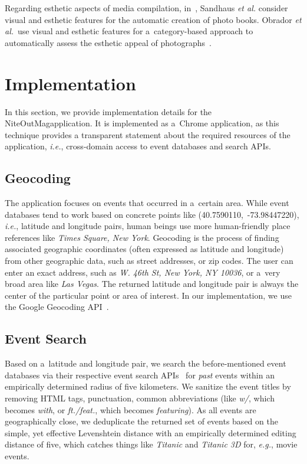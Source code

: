 \documentclass{acm_proc_article-sp}
\let\oldemph\emph
\renewcommand{\emph}[1]{\oldemph{\fontsize{9}{9}\selectfont #1}}
\begin{document}
Regarding esthetic aspects of media compilation,
in~\cite{Sandhaus2011}, Sandhaus \emph{et al.} consider visual and
esthetic features for the automatic creation of photo books.
Obrador \emph{et al.}\ use visual and esthetic features
for a~category-based approach to automatically assess
the esthetic appeal of photographs~\cite{Obrador2012}.

\section{Implementation}
In this section, we provide implementation details for the
NiteOutMag\texttrademark application.
It is implemented as a~Chrome application, as this technique provides
a transparent statement about the required resources of the application,
\emph{i.e.}, cross-domain access to event databases and search APIs.

\subsection{Geocoding}
The application focuses on events that occurred in a~certain area.
While event databases tend to work based on concrete points like
\mbox{(40.7590110, -73.98447220)}, \emph{i.e.},
latitude and longitude pairs, human beings use more human-friendly place references
like \emph{Times Square, New York}.
Geocoding is the process of finding associated geographic coordinates
(often expressed as latitude and longitude) from other geographic data,
such as street addresses, or zip codes.
The user can enter an exact address, such as
\emph{618 W. 46th St, New York, NY 10036}, or a~very broad area like \emph{Las Vegas}.
The returned latitude and longitude pair is always the center
of the particular point or area of interest.
In our implementation, we use the Google Geocoding API~\cite{Geocoding2012}.

\subsection{Event Search}
Based on a~latitude and longitude pair, we search the before-mentioned
event databases via their respective event search
APIs~\cite{Eventful2012,Foursquare2012,GooglePlaces2012,Upcoming2012}
for \emph{past} events within an empirically determined radius of five kilometers.
We sanitize the event titles by removing HTML tags, punctuation,
common abbreviations (like \emph{w/}, which becomes \emph{with}, or \emph{ft./feat.},
which becomes \emph{featuring}).
As all events are geographically close, we deduplicate the returned set of events
based on the simple, yet effective Levenshtein distance
with an empirically determined editing distance of five,
which catches things like \emph{Titanic} and \emph{Titanic 3D} for, \emph{e.g.}, movie events.
\end{document}
